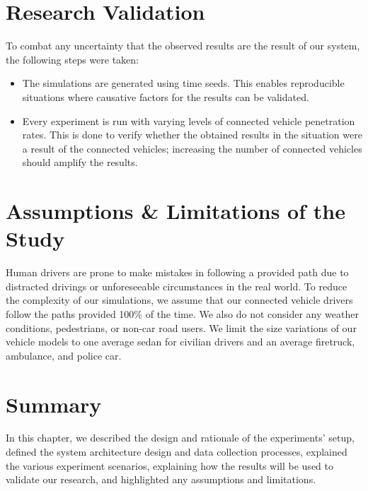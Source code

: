 \section{Research Validation}
	To combat any uncertainty that the observed results are the result of our system, the following steps were taken:
	\begin{itemize}
		\item The simulations are generated using time seeds. This enables reproducible situations where causative factors for the results can be validated.
		\item Every experiment is run with varying levels of connected vehicle penetration rates. This is done to verify whether the obtained results in the situation were a result of the connected vehicles; increasing the number of connected vehicles should amplify the results.
	\end{itemize}


\section{Assumptions \& Limitations of the Study}
	Human drivers are prone to make mistakes in following a provided path due to distracted drivings or unforeseeable circumstances in the real world. To reduce the complexity of our simulations, we assume that our connected vehicle drivers follow the paths provided 100\% of the time. We also do not consider any weather conditions, pedestrians, or non-car road users. We limit the size variations of our vehicle models to one average sedan for civilian drivers and an average firetruck, ambulance, and police car.


\section{Summary}
	In this chapter, we described the design and rationale of the experiments' setup, defined the system architecture design and data collection processes, explained the various experiment scenarios, explaining how the results will be used to validate our research, and highlighted any assumptions and limitations.
